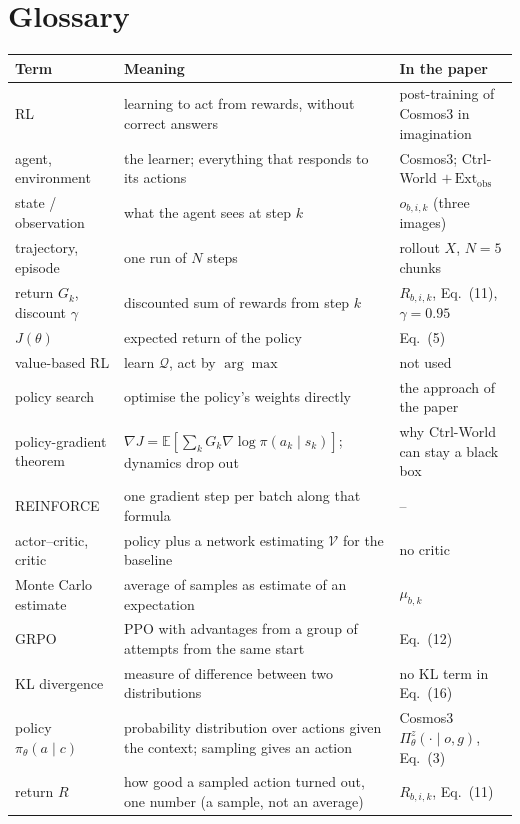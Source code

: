 \documentclass[11pt,a4paper]{article}
\newcommand{\E}{\mathbb{E}}
\newcommand{\Vf}{\mathcal{V}}
\newcommand{\Qf}{\mathcal{Q}}
\begin{document}
\section*{Glossary}
\begin{center}
\small
\begin{tabularx}{\linewidth}{@{}l Y >{\raggedright\arraybackslash}p{4.2cm}@{}}
\toprule
Term & Meaning & In the paper\\
\midrule
RL & learning to act from rewards, without correct answers & post-training of Cosmos3 in imagination\\
agent, environment & the learner; everything that responds to its actions & Cosmos3; Ctrl-World $+\,\mathrm{Ext}_{\mathrm{obs}}$\\
state / observation & what the agent sees at step $k$ & $o_{b,i,k}$ (three images)\\
trajectory, episode & one run of $N$ steps & rollout $X$, $N=5$ chunks\\
return $G_k$, discount $\gamma$ & discounted sum of rewards from step $k$ & $R_{b,i,k}$, Eq.~(11), $\gamma=0.95$\\
$J(\theta)$ & expected return of the policy & Eq.~(5)\\
value-based RL & learn $\Qf$, act by $\arg\max$ & not used\\
policy search & optimise the policy's weights directly & the approach of the paper\\
policy-gradient theorem & $\nabla J=\E[\sum_kG_k\nabla\log\pi(a_k\mid s_k)]$; dynamics drop out & why Ctrl-World can stay a black box\\
REINFORCE & one gradient step per batch along that formula & --\\
actor--critic, critic & policy plus a network estimating $\Vf$ for the baseline & no critic\\
Monte Carlo estimate & average of samples as estimate of an expectation & $\mu_{b,k}$\\
GRPO & PPO with advantages from a group of attempts from the same start & Eq.~(12)\\
KL divergence & measure of difference between two distributions & no KL term in Eq.~(16)\\
policy $\pi_\theta(a\mid c)$ & probability distribution over actions given the context; sampling gives an action & Cosmos3 $\Pi^z_\theta(\cdot\mid o,g)$, Eq.~(3)\\
return $R$ & how good a sampled action turned out, one number (a sample, not an average) & $R_{b,i,k}$, Eq.~(11)\\

\end{tabularx}
\end{center}
\end{document}
